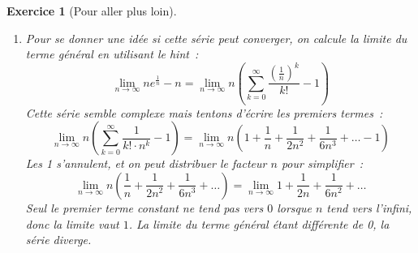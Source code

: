 \documentclass[11.5pt,french,table]{article}
\theoremstyle{exercice}
\newtheorem{exercice}{Exercice}
\begin{document}
\begin{exercice}[Pour aller plus loin]
\begin{enumerate}
    Maintenant que l'on possède cette fraction décomposée, on peut réécrire notre somme partielle~:
    \[
    S_n = \sum_{k = 1}^{n} \frac{1}{k(k+5)} = \sum_{k = 1}^{n} \frac{1}{5k} - \frac{1}{5(k+5)} = \frac{1}{5}\left(\sum_{k = 1}^{n} \frac{1}{k} - \sum_{k = 1}^{n} \frac{1}{k+5}\right)
    \]
    Notre objectif est de simplifier les 2 sommes que l'on a créé. Si l'on étend les termes de nos deux sommes, on obtient~:
    \begin{align*}
    \sum_{k = 1}^{n} \frac{1}{k} & = 1 + \frac{1}{2} + \frac{1}{3} + ... + \frac{1}{n} \\
    \sum_{k = 1}^{n} \frac{1}{k + 5} & = \frac{1}{6} + \frac{1}{7} + \frac{1}{8} + ... + \frac{1}{n} + \frac{1}{n + 1} + \ldots + \frac{1}{n + 5}
    \end{align*}
    Les termes de $\frac{1}{6}$ à $\frac{1}{n}$ sont en commun aux deux sommes, donc ils se simplifient lors de la soustraction. Ainsi, il nous reste uniquement les termes $1$, $\frac{1}{2}$, jusqu'à $\frac{1}{5}$, ainsi que les termes $\frac{1}{n+1}$ jusqu'à $\frac{1}{n+5}$ qui sont soustraits~:
    \begin{align*}
    S_n & = \frac{1}{5} \left(1 + \frac{1}{2} + \frac{1}{3} + \frac{1}{4} + \frac{1}{5} - \frac{1}{n + 1} - \frac{1}{n + 2} - \frac{1}{n + 3} - \frac{1}{n + 4} - \frac{1}{n + 5}\right) \\
    & = \frac{137}{300} - \frac{1}{5}\left(\frac{1}{n + 1} + \frac{1}{n + 2} + \frac{1}{n + 3} + \frac{1}{n + 4} + \frac{1}{n + 5}\right)
    \end{align*}
    Puisque les derniers termes tendent vers $0$ lorsque l'on prend la limite à l'infini, la valeur de la série est finalement
    \[
    \sum_{n=1}^\infty \frac{1}{n(n+5)} = \lim_{n \to \infty} S_n = \frac{137}{300}
    \]
    
    \item Pour se donner une idée si cette série peut converger, on calcule la limite du terme général en utilisant le hint~:
    \[
    \lim_{n \to \infty} ne^{\frac{1}{n}} - n = \lim_{n \to \infty} n\left(\sum_{k=0}^\infty \frac{(\frac{1}{n})^k}{k!} - 1\right)
    \]
    Cette série semble complexe mais tentons d'écrire les premiers termes~:
    \[
    \lim_{n \to \infty} n\left(\sum_{k=0}^\infty \frac{1}{k! \cdot n^k} - 1\right) = \lim_{n \to \infty} n\left(1 + \frac{1}{n} + \frac{1}{2n^2} + \frac{1}{6n^3} + \ldots - 1\right)
    \]
    Les 1 s'annulent, et on peut distribuer le facteur $n$ pour simplifier~:
    \[
    \lim_{n \to \infty} n\left(\frac{1}{n} + \frac{1}{2n^2} + \frac{1}{6n^3} + \ldots\right) = \lim_{n \to \infty} 1 + \frac{1}{2n} + \frac{1}{6n^2} + \ldots
    \]
    Seul le premier terme constant ne tend pas vers $0$ lorsque $n$ tend vers l'infini, donc la limite vaut $1$. La limite du terme général étant différente de 0, la série diverge.
\end{enumerate}
\end{exercice}
\end{document}
